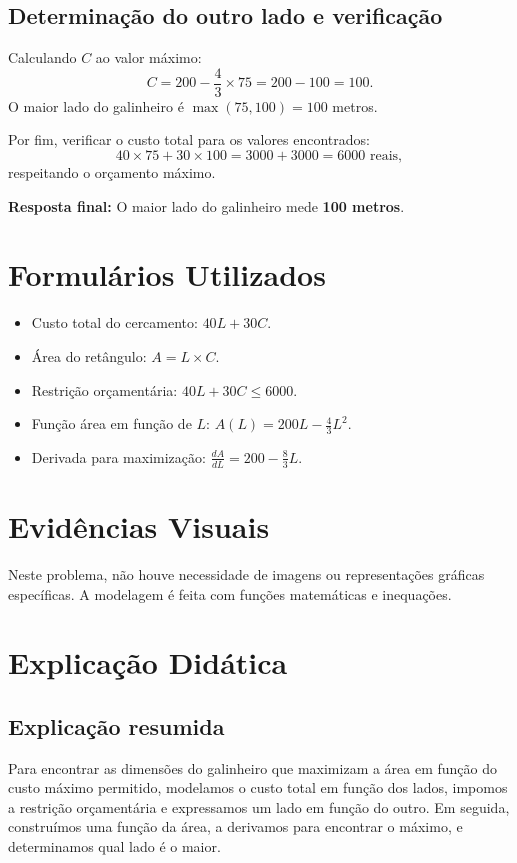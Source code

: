\documentclass{article}
\begin{document}
\subsection{Determinação do outro lado e verificação}
Calculando $C$ ao valor máximo:
\[
C = 200 - \frac{4}{3} \times 75 = 200 - 100 = 100.
\]
O maior lado do galinheiro é $\max(75, 100) = 100$ metros.

Por fim, verificar o custo total para os valores encontrados:
\[
40 \times 75 + 30 \times 100 = 3000 + 3000 = 6000 \text{ reais},
\]
respeitando o orçamento máximo.

\textbf{Resposta final:} O maior lado do galinheiro mede \textbf{100 metros}.

\section{Formulários Utilizados}
\begin{itemize}
  \item Custo total do cercamento: $40L + 30C$.
  \item Área do retângulo: $A = L \times C$.
  \item Restrição orçamentária: $40L + 30C \leq 6000$.
  \item Função área em função de $L$: $A(L) = 200L - \frac{4}{3}L^{2}$.
  \item Derivada para maximização: $\frac{dA}{dL} = 200 - \frac{8}{3}L$.
\end{itemize}

\section{Evidências Visuais}
Neste problema, não houve necessidade de imagens ou representações gráficas específicas. A modelagem é feita com funções matemáticas e inequações.

\section{Explicação Didática}
\subsection{Explicação resumida}
Para encontrar as dimensões do galinheiro que maximizam a área em função do custo máximo permitido, modelamos o custo total em função dos lados, impomos a restrição orçamentária e expressamos um lado em função do outro. Em seguida, construímos uma função da área, a derivamos para encontrar o máximo, e determinamos qual lado é o maior.
\end{document}

